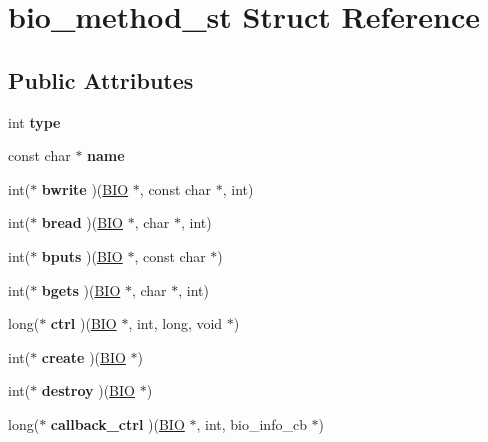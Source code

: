 \hypertarget{structbio__method__st}{}\section{bio\+\_\+method\+\_\+st Struct Reference}
\label{structbio__method__st}
\subsection*{Public Attributes}
\begin{DoxyCompactItemize}
\item 
\mbox{\label{structbio__method__st_aa17907bd09e726ddc073966bdd224b5b}} 
int {\bfseries type}
\item 
\mbox{\label{structbio__method__st_af69506d10c7b6ee584d7ebf99a1b84ba}} 
const char $\ast$ {\bfseries name}
\item 
\mbox{\label{structbio__method__st_ae24e468c844e654724faccdc87d88a62}} 
int($\ast$ {\bfseries bwrite} )(\hyperlink{structbio__st}{B\+IO} $\ast$, const char $\ast$, int)
\item 
\mbox{\label{structbio__method__st_aa92125381017c6b2641439943cce9072}} 
int($\ast$ {\bfseries bread} )(\hyperlink{structbio__st}{B\+IO} $\ast$, char $\ast$, int)
\item 
\mbox{\label{structbio__method__st_a733f66ebc2d8c513c6a286ffbc629428}} 
int($\ast$ {\bfseries bputs} )(\hyperlink{structbio__st}{B\+IO} $\ast$, const char $\ast$)
\item 
\mbox{\label{structbio__method__st_a8fae124b9b9854cb1dfbee68db660b30}} 
int($\ast$ {\bfseries bgets} )(\hyperlink{structbio__st}{B\+IO} $\ast$, char $\ast$, int)
\item 
\mbox{\label{structbio__method__st_ad0b4e0005a2dc107eb04a0dbec8f26b6}} 
long($\ast$ {\bfseries ctrl} )(\hyperlink{structbio__st}{B\+IO} $\ast$, int, long, void $\ast$)
\item 
\mbox{\label{structbio__method__st_a79d9b2836d02d86c8aaf859093e5a3f5}} 
int($\ast$ {\bfseries create} )(\hyperlink{structbio__st}{B\+IO} $\ast$)
\item 
\mbox{\label{structbio__method__st_a082d42c342cf11044b9a634ae96a4c94}} 
int($\ast$ {\bfseries destroy} )(\hyperlink{structbio__st}{B\+IO} $\ast$)
\item 
\mbox{\label{structbio__method__st_a6b1b0a905468bba2ee191ae0401a65a3}} 
long($\ast$ {\bfseries callback\+\_\+ctrl} )(\hyperlink{structbio__st}{B\+IO} $\ast$, int, bio\+\_\+info\+\_\+cb $\ast$)
\end{DoxyCompactItemize}


